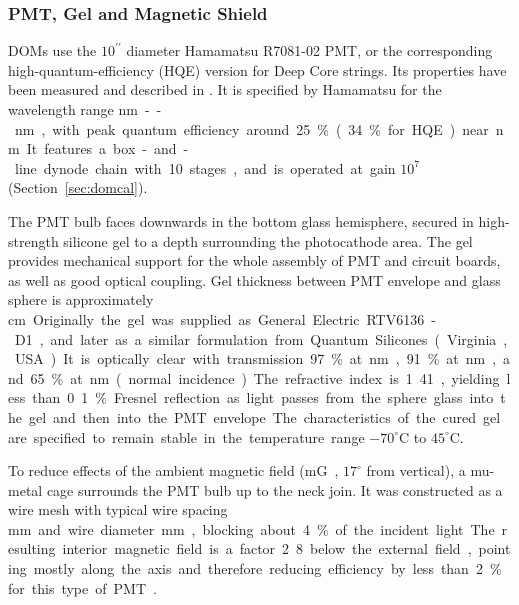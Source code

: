 \subsubsection{\label{sec:pmt}PMT, Gel and Magnetic Shield}


DOMs use the $10^{\prime\prime}$ diameter Hamamatsu R7081-02 PMT, 
or the corresponding high-quantum-efficiency (HQE) version for Deep Core strings.
Its properties have been measured and described in \cite{ref:pmt}.  It is specified by Hamamatsu for
the wavelength range \unit[300]nm--\unit[650]nm, with peak quantum efficiency around 25\% (34\% for HQE)
near \unit[390]nm.  It features a box-and-line dynode chain with 10 stages, and is operated at gain $10^7$
(Section~\ref{sec:domcal}).

The PMT bulb faces downwards in the bottom glass hemisphere, secured in high-strength 
silicone gel to a depth surrounding the photocathode area.  
The gel provides mechanical support for the whole assembly of PMT and circuit boards,
as well as good optical coupling.  
Gel thickness between PMT envelope and glass sphere is approximately \unit[1]cm.  
Originally the gel was supplied as General Electric RTV6136-D1,
and later as a similar formulation from Quantum Silicones (Virginia, USA).  
It is optically clear with transmission 97\% at \unit[400]nm, 91\% at \unit[340]nm, and 65\% at \unit[300]nm
(normal incidence).  The refractive index is 1.41, yielding less than 0.1\% Fresnel reflection as light
passes from the sphere glass into the gel and then into the PMT envelope.
The characteristics of the cured gel are specified to remain stable in the temperature range $-70^\circ$C to $45^\circ$C.

To reduce effects of the ambient magnetic field (\unit[550]mG, $17^\circ$ from vertical), a mu-metal cage surrounds the PMT bulb up to
the neck join.  It was constructed as a wire mesh with typical wire spacing \unit[66]mm and
wire diameter \unit[1]mm, blocking about 4\% of the incident light.
The resulting interior magnetic field is a factor 2.8 below
the external field, pointing mostly along the axis and therefore reducing efficiency by
less than 2\% for this type of PMT~\cite{ref:calvo}.

